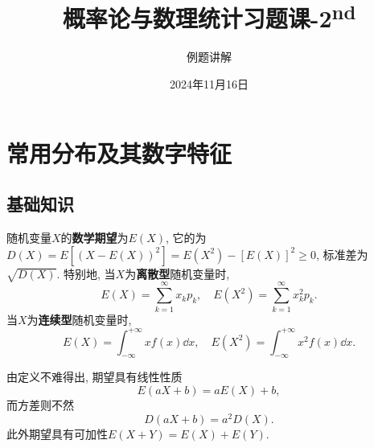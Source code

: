 \documentclass[11pt]{ctexart}
\title{概率论与数理统计习题课-2\textsuperscript{nd}}
\author{例题讲解}
\date{2024年11月16日}
\begin{document}
\maketitle
{ 	
	\footnotesize
	\keben
	\tableofcontents
}





\section{常用分布及其数字特征}

\subsection{基础知识}

随机变量$X$的\textbf{数学期望}为$E(X)$, 它的为$D(X) = E[(X - E(X))^2] = E(X^2) - [E(X)]^2 \geq 0$, 标准差为$\sqrt{D(X)}$. 
特别地, 当$X$为\textbf{离散型}随机变量时, 
\begin{equation*}
	E(X) = \sum_{k=1}^{\infty} x_k p_k, \quad E(X^2) = \sum_{k=1}^{\infty} x_k^2 p_k. 
\end{equation*}
当$X$为\textbf{连续型}随机变量时, 
\begin{equation*}
	E(X) = \int_{-\infty}^{+\infty} x f(x) \dd x, \quad E(X^2) = \int_{-\infty}^{+\infty} x^2 f(x) \dd x. 
\end{equation*}

由定义不难得出, 期望具有线性性质
\begin{equation*}
	E(aX + b) = aE(X) + b, 
\end{equation*}
而方差则不然
\begin{equation*}
	D(aX+ b) = a^2 D(X).
\end{equation*}
此外期望具有可加性$E(X+Y) = E(X) + E(Y)$. 
\end{document}
